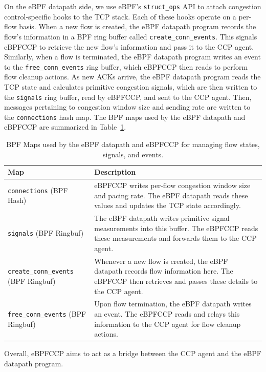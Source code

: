 \documentclass[../main.tex]{subfiles}
\begin{document}
On the eBPF datapath side, we use eBPF's \texttt{struct\_ops} API to attach congestion control-specific hooks to the TCP stack.
Each of these hooks operate on a per-flow basis.
When a new flow is created, the eBPF datapath program records the flow's information in a BPF ring buffer called \texttt{create\_conn\_events}.
This signals eBPFCCP to retrieve the new flow's information and pass it to the CCP agent.
Similarly, when a flow is terminated, the eBPF datapath program writes an event to the \texttt{free\_conn\_events} ring buffer, which eBPFCCP then reads to perform flow cleanup actions.
As new ACKs arrive, the eBPF datapath program reads the TCP state and calculates primitive congestion signals, which are then written to the \texttt{signals} ring buffer, read by eBPFCCP, and sent to the CCP agent.
Then, messages pertaining to congestion window size and sending rate are written to the \texttt{connections} hash map.
The BPF maps used by the eBPF datapath and eBPFCCP are summarized in Table~\ref{tab:maptable}.

\begin{table}[htbp]
    \centering
    \footnotesize
    \begin{tabular}{@{}p{} p{}@{}}
        \toprule
        \textbf{Map} & \textbf{Description} \\[3pt]
        \midrule
        \texttt{connections} (BPF Hash) &
        eBPFCCP writes per-flow congestion window size and pacing rate. 
        The eBPF datapath reads these values and updates the TCP state accordingly. \\[6pt]
        
        \texttt{signals} (BPF Ringbuf) &
        The eBPF datapath writes primitive signal measurements into this buffer. 
        The eBPFCCP reads these measurements and forwards them to the CCP agent. \\[6pt]
        
        \texttt{create\_conn\_events} (BPF Ringbuf) &
        Whenever a new flow is created, the eBPF datapath records flow information here. 
        The eBPFCCP then retrieves and passes these details to the CCP agent. \\[6pt]
        
        \texttt{free\_conn\_events} (BPF Ringbuf) &
        Upon flow termination, the eBPF datapath writes an event. 
        The eBPFCCP reads and relays this information to the CCP agent for flow cleanup actions. \\[3pt]
        \bottomrule
    \end{tabular}
    \caption{BPF Maps used by the eBPF datapath and eBPFCCP for managing flow states, signals, and events.}
    \label{tab:maptable}
\end{table}

Overall, eBPFCCP aims to act as a bridge between the CCP agent and the eBPF datapath program.
\end{document}
